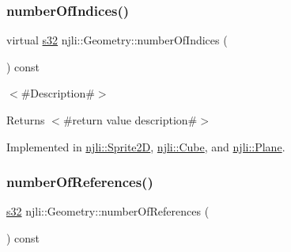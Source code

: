 \mbox{\label{classnjli_1_1_geometry_a1033c9f6dee9f725b122c2ddd33f4b0e}} 
\subsubsection{\texorpdfstring{number\+Of\+Indices()}{numberOfIndices()}}
{\footnotesize\ttfamily virtual \mbox{\hyperlink{_util_8h_aa62c75d314a0d1f37f79c4b73b2292e2}{s32}} njli\+::\+Geometry\+::number\+Of\+Indices (\begin{DoxyParamCaption}{ }\end{DoxyParamCaption}) const\hspace{0.3cm}{\ttfamily [pure virtual]}}

$<$\#\+Description\#$>$

\begin{DoxyReturn}{Returns}
$<$\#return value description\#$>$ 
\end{DoxyReturn}


Implemented in \mbox{\hyperlink{classnjli_1_1_sprite2_d_aadc09bc806fa16ad2b4dbe2e9cfba24e}{njli\+::\+Sprite2D}}, \mbox{\hyperlink{classnjli_1_1_cube_a122d3a2b1e326ec33a865cc6f3391229}{njli\+::\+Cube}}, and \mbox{\hyperlink{classnjli_1_1_plane_a4dd558b3278ca76bfd21d2ec9f02b87b}{njli\+::\+Plane}}.

\mbox{\label{classnjli_1_1_geometry_a555e9b90676b286bf036902e164e6fa4}} 
\subsubsection{\texorpdfstring{number\+Of\+References()}{numberOfReferences()}}
{\footnotesize\ttfamily \mbox{\hyperlink{_util_8h_aa62c75d314a0d1f37f79c4b73b2292e2}{s32}} njli\+::\+Geometry\+::number\+Of\+References (\begin{DoxyParamCaption}{ }\end{DoxyParamCaption}) const}

\mbox{\label{classnjli_1_1_geometry_a27b42b7a7ed3c67a6f8827288828687a}} 
